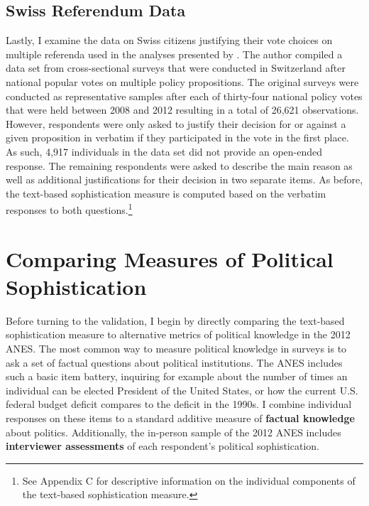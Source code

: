 \documentclass[12pt]{article}
\begin{document}



\subsection*{Swiss Referendum Data}

Lastly, I examine the data on Swiss citizens justifying their vote choices on multiple referenda used in the analyses presented by \citet{colombo2016justifications}. The author compiled a data set from cross-sectional surveys that were conducted in Switzerland after national popular votes on multiple policy propositions. The original surveys were conducted as representative samples after each of thirty-four national policy votes that were held between 2008 and 2012 resulting in a total of 26,621 observations. However, respondents were only asked to justify their decision for or against a given proposition in verbatim if they participated in the vote in the first place. As such, 4,917 individuals in the data set did not provide an open-ended response. The remaining respondents were asked to describe the main reason as well as additional justifications for their decision in two separate items. As before, the text-based sophistication measure is computed based on the verbatim responses to both questions.\footnote{See Appendix C for descriptive information on the individual components of the text-based sophistication measure.}



\section*{Comparing Measures of Political Sophistication}


Before turning to the validation, I begin by directly comparing the text-based sophistication measure to alternative metrics of political knowledge in the 2012 ANES. The most common way to measure political knowledge in surveys is to ask a set of factual questions about political institutions. The ANES includes such a basic item battery, inquiring for example about the number of times an individual can be elected President of the United States, or how the current U.S. federal budget deficit compares to the deficit in the 1990s. I combine individual responses on these items to a standard additive measure of \textbf{factual knowledge} about politics. Additionally, the in-person sample of the 2012 ANES includes \textbf{interviewer assessments} of each respondent's political sophistication.
\end{document}
